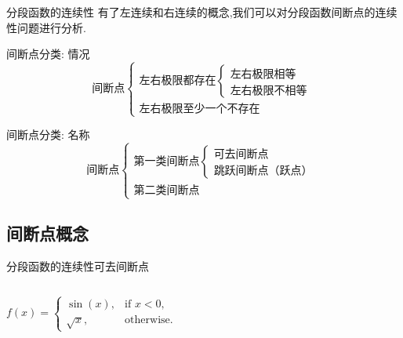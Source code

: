 \documentclass[
10pt,
aspectratio=43,
]{beamer}
\begin{document}
\begin{frame}{分段函数的连续性}
	有了左连续和右连续的概念,我们可以对分段函数间断点的连续性问题进行分析.
	\pause
	\begin{block}{间断点分类: 情况}
		\begin{equation*}
			\text{间断点}\left\{
			\begin{array}{ll}
				\text{左右极限都存在}\left\{ 
				\begin{array}{ll}                   
				\text{左右极限相等}           \\
				\text{左右极限不相等}        
			\end{array}
			\right.\\
			\text{左右极限至少一个不存在}
			\end{array}
			\right.
		\end{equation*}
	\end{block}
	\pause
	\begin{exampleblock}{间断点分类: 名称}
		\begin{equation*}
			\text{间断点}\left\{
			\begin{array}{ll}
				\text{第一类间断点}\left\{   
				\begin{array}{ll}                  
				\text{可去间断点}             \\
				\text{跳跃间断点（跃点）} 
			\end{array}
			\right.\\
			\text{第二类间断点}
			\end{array}
			\right.
		\end{equation*}
	\end{exampleblock}
\end{frame}

\subsection{间断点概念}
\begin{frame}{分段函数的连续性}{可去间断点}
	\begin{columns}[onlytextwidth]
		\[
			f(x) = \begin{cases}
			\sin(x), & \text{if } x < 0, \\
			\sqrt{x}, & \text{otherwise}.
			\end{cases}
		\]
	\end{columns}
\end{frame}
\end{document}
